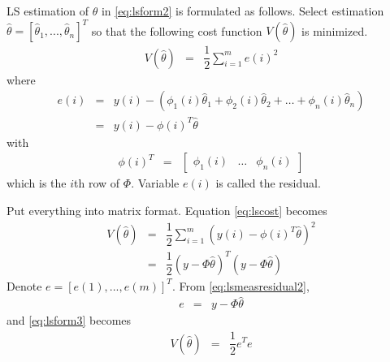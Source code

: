 LS estimation of $\theta$ in \eqref{eq:lsform2} is formulated as follows. Select estimation $\hat{\theta} = [\hat{\theta}_1, ..., \hat{\theta}_n]^T$ so that the following cost function $V(\hat{\theta})$ is minimized.
\begin{eqnarray}
  V(\hat{\theta}) &=& \dfrac{1}{2}\sum_{i=1}^{m}e(i)^2 \label{eq:lscost}
\end{eqnarray}
where
\begin{eqnarray}
  e(i) &=& y(i) - \left(\phi_1(i)\hat{\theta}_1 + \phi_2(i)\hat{\theta}_2 + \ldots + \phi_n(i)\hat{\theta}_n\right) \nonumber \\
  &=& y(i) - \phi(i)^T\hat{\theta} \label{eq:lsmeasresidual2}
\end{eqnarray}
with
\begin{eqnarray}
  \phi(i)^T &=& \left[\begin{array}{ccc}
                        \phi_1(i) & \ldots & \phi_n(i)
                      \end{array}\right] \label{eq:lsmeasresidual3}
\end{eqnarray}
which is the $i$th row of $\Phi$. Variable $e(i)$ is called the residual.

Put everything into matrix format. Equation \eqref{eq:lscost} becomes
\begin{eqnarray}
	V(\hat{\theta}) &=& \dfrac{1}{2}\sum_{i=1}^{m} \left(y(i) - \phi(i)^T\hat{\theta}\right)^2 \nonumber \\
	&=& \dfrac{1}{2}(y - \Phi\hat{\theta})^T(y - \Phi\hat{\theta}) \label{eq:lsform3}
\end{eqnarray}
Denote $e = [e(1), ..., e(m)]^T$. From \eqref{eq:lsmeasresidual2},
\begin{eqnarray}
  e &=& y - \Phi\hat{\theta} \label{eq:lsmeasresidual1}
\end{eqnarray}
and \eqref{eq:lsform3} becomes
\begin{eqnarray}
	V(\hat{\theta}) &=& \dfrac{1}{2}e^Te \label{eq:lsform4}
\end{eqnarray}

